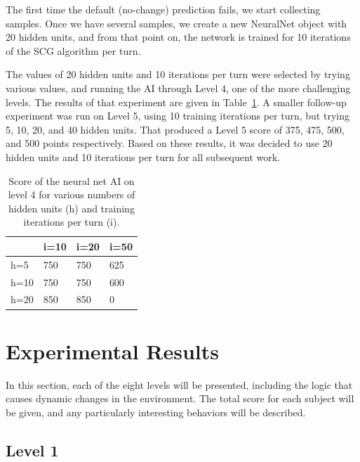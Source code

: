 \documentclass{article}
\begin{document}
The first time the default (no-change) prediction fails, we start collecting samples.  Once we have several samples, we create a new NeuralNet object with 20 hidden units, and from that point on, the network is trained for 10 iterations of the SCG algorithm per turn.

The values of 20 hidden units and 10 iterations per turn were selected by trying various values, and running the AI through Level 4, one of the more challenging levels.  The results of that experiment are given in Table~\ref{netParamsTable}.  A smaller follow-up experiment was run on Level 5, using 10 training iterations per turn, but trying 5, 10, 20, and 40 hidden units.  That produced a Level 5 score of 375, 475, 500, and 500 points respectively.  Based on these results, it was decided to use 20 hidden units and 10 iterations per turn for all subsequent work.

\begin{table}
  \begin{center}
    \begin{tabular}{|l|l|l|l|}
        \cline{2-4}
        \multicolumn{1}{c|}{} & i=10 & i=20 & i=50 \\ \hline
        h=5  & 750  & 750  & 625  \\ 
        h=10 & 750  & 750  & 600  \\ 
        h=20 & 850  & 850  & 0    \\
        \hline
    \end{tabular}
    \caption{Score of the neural net AI on level 4 for various numbers of hidden units (h) and training iterations per turn (i).}
    \label{netParamsTable}
  \end{center}
\end{table}

\section{Experimental Results}

In this section, each of the eight levels will be presented, including the logic that causes dynamic changes in the environment.  The total score for each subject will be given, and any particularly interesting behaviors will be described.

\subsection{Level 1}
\end{document}
